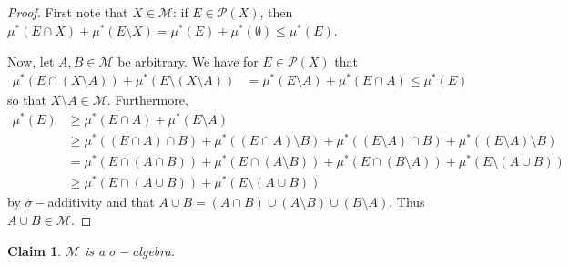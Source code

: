 \documentclass[11pt, a4paper]{memoir}
\theoremstyle{change}
\theoremstyle{plain}
\newtheorem{claim}{Claim}
\theoremstyle{nonumberplain}
\newtheorem{proof}{Proof}
\numberwithin{equation}{section}
\begin{document}
\begin{proof}
    First note that $X\in\mathcal{M}$: if $E\in\mathcal{P}(X)$, then $\mu^*(E\cap X)+\mu^*(E\setminus X)=\mu^*(E)+\mu^*(\emptyset)\leq \mu^*(E)$.

    Now, let $A,B\in\mathcal{M}$ be arbitrary.
    We have for $E\in\mathcal{P}(X)$ that
    \begin{align*}
        \mu^*(E\cap(X\setminus A))+\mu^*(E\setminus(X\setminus A)) &= \mu^*(E\setminus A)+\mu^*(E\cap A)\leq\mu^*(E)
    \end{align*}
    so that $X\setminus A\in\mathcal{M}$.
    Furthermore,
    \begin{align*}
        \mu^*(E) &\geq \mu^*(E\cap A)+\mu^*(E\setminus A)\\
                 &\geq \mu^*((E\cap A)\cap B)+\mu^*((E\cap A)\setminus B)+\mu^*((E\setminus A)\cap B)+\mu^*((E\setminus A)\setminus B)\\
                 &= \mu^*(E\cap(A\cap B))+\mu^*(E\cap(A\setminus B))+\mu^*(E\cap(B\setminus A))+\mu^*(E\setminus(A\cup B))\\
                 &\geq \mu^*(E\cap(A\cup B))+\mu^*(E\setminus(A\cup B))
    \end{align*}
    by $\sigma-$additivity and that $A\cup B=(A\cap B)\cup(A\setminus B)\cup(B\setminus A)$.
    Thus $A\cup B\in\mathcal{M}$.
\end{proof}
\begin{claim}
    $\mathcal{M}$ is a $\sigma-$algebra.
\end{claim}
\end{document}
